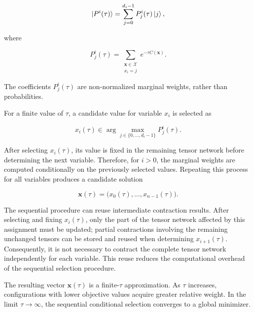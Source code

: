 \documentclass[%
 reprint,
 amsmath,amssymb,
 aps,
 pra,showkeys,
]{revtex4-2}
\begin{document}
\begin{equation}
\label{eq:melocoton_marginal}
\ket{P^i(\tau)}
=
\sum_{j=0}^{d_i-1}
P^i_j(\tau)\ket{j},
\end{equation}

where

\begin{equation}
\label{eq:melocoton_weight}
P^i_j(\tau)
=
\sum_{\substack{
\boldsymbol{x}\in\mathcal{X}\\
x_i=j
}}
e^{-\tau C(\boldsymbol{x})}.
\end{equation}

The coefficients $P^i_j(\tau)$ are non-normalized marginal weights,
rather than probabilities.

For a finite value of $\tau$, a candidate value for variable $x_i$
is selected as

\begin{equation}
\label{eq:melocoton_argmax}
x_i(\tau)
\in
\arg\max_{j\in\{0,\ldots,d_i-1\}}
P^i_j(\tau).
\end{equation}

After selecting $x_i(\tau)$, its value is fixed in the remaining tensor
network before determining the next variable. Therefore, for $i>0$,
the marginal weights are computed conditionally on the previously
selected values. Repeating this process for all variables produces a
candidate solution

\begin{equation}
\boldsymbol{x}(\tau)
=
\bigl(x_0(\tau),\ldots,x_{n-1}(\tau)\bigr).
\end{equation}

The sequential procedure can reuse intermediate contraction results.
After selecting and fixing $x_i(\tau)$, only the part of the tensor
network affected by this assignment must be updated; partial
contractions involving the remaining unchanged tensors can be stored
and reused when determining $x_{i+1}(\tau)$. Consequently, it is not
necessary to contract the complete tensor network independently for
each variable. This reuse reduces the computational overhead of the
sequential selection procedure.

The resulting vector $\boldsymbol{x}(\tau)$ is a finite-$\tau$
approximation. As $\tau$ increases, configurations with lower objective
values acquire greater relative weight. In the limit
$\tau\rightarrow\infty$, the sequential conditional selection
converges to a global minimizer.
\end{document}
